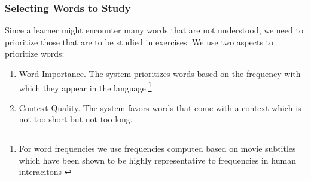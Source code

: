 \subsubsection{Selecting Words to Study}

Since a learner might encounter many words that are not understood, we need to prioritize those that are to be studied in exercises. We use two aspects to prioritize words: 


\begin{enumerate}

  \item Word Importance. The system prioritizes words based on the frequency with which they appear in the language.\footnote{For word frequencies we use frequencies computed based on movie subtitles which have been shown to be highly representative to frequencies in human interacitons \cite{New07-subtitles}}. 
  
  \item Context Quality. The system favors words that come with a context which is not too short but not too long. 

\end{enumerate}

